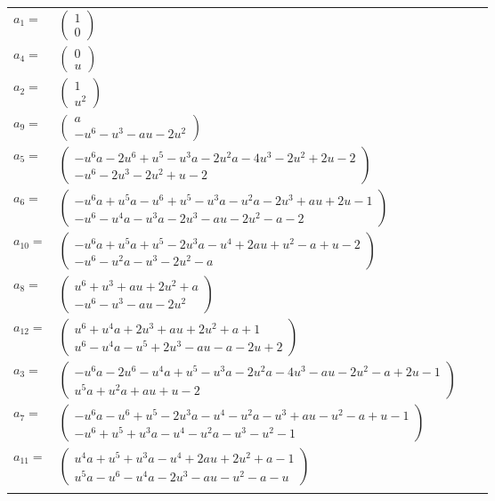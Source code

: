\documentclass[1p]{elsarticle_modified}
\theoremstyle{definition}
\begin{document}
\begin{tabular}{m{7pt} m{180pt} m{7pt} m{180pt} }
\flushright $a_{1}=$&$\begin{pmatrix}1\\0\end{pmatrix}$ \\
\flushright $a_{4}=$&$\begin{pmatrix}0\\u\end{pmatrix}$ \\
\flushright $a_{2}=$&$\begin{pmatrix}1\\u^2\end{pmatrix}$ \\
\flushright $a_{9}=$&$\begin{pmatrix}a\\- u^6- u^3- a u-2 u^2\end{pmatrix}$ \\
\flushright $a_{5}=$&$\begin{pmatrix}- u^6 a-2 u^6+u^5- u^3 a-2 u^2 a-4 u^3-2 u^2+2 u-2\\- u^6-2 u^3-2 u^2+u-2\end{pmatrix}$ \\
\flushright $a_{6}=$&$\begin{pmatrix}- u^6 a+u^5 a- u^6+u^5- u^3 a- u^2 a-2 u^3+a u+2 u-1\\- u^6- u^4 a- u^3 a-2 u^3- a u-2 u^2- a-2\end{pmatrix}$ \\
\flushright $a_{10}=$&$\begin{pmatrix}- u^6 a+u^5 a+u^5-2 u^3 a- u^4+2 a u+u^2- a+u-2\\- u^6- u^2 a- u^3-2 u^2- a\end{pmatrix}$ \\
\flushright $a_{8}=$&$\begin{pmatrix}u^6+u^3+a u+2 u^2+a\\- u^6- u^3- a u-2 u^2\end{pmatrix}$ \\
\flushright $a_{12}=$&$\begin{pmatrix}u^6+u^4 a+2 u^3+a u+2 u^2+a+1\\u^6- u^4 a- u^5+2 u^3- a u- a-2 u+2\end{pmatrix}$ \\
\flushright $a_{3}=$&$\begin{pmatrix}- u^6 a-2 u^6- u^4 a+u^5- u^3 a-2 u^2 a-4 u^3- a u-2 u^2- a+2 u-1\\u^5 a+u^2 a+a u+u-2\end{pmatrix}$ \\
\flushright $a_{7}=$&$\begin{pmatrix}- u^6 a- u^6+u^5-2 u^3 a- u^4- u^2 a- u^3+a u- u^2- a+u-1\\- u^6+u^5+u^3 a- u^4- u^2 a- u^3- u^2-1\end{pmatrix}$ \\
\flushright $a_{11}=$&$\begin{pmatrix}u^4 a+u^5+u^3 a- u^4+2 a u+2 u^2+a-1\\u^5 a- u^6- u^4 a-2 u^3- a u- u^2- a- u\end{pmatrix}$\\&\end{tabular}
\end{document}
